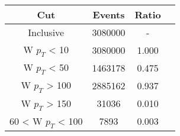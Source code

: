\begin{tabular}{|c||c|c|c|}
\hline
Cut & Events & Ratio\\\hline
Inclusive & 3080000 & - \\
W $p_{T}$ < 10 & 3080000 & 1.000 \\
W $p_{T}$ < 50 & 1463178 & 0.475 \\
W $p_{T}$ > 100 & 2885162 & 0.937 \\
W $p_{T}$ > 150 & 31036 & 0.010 \\
60 < W $p_{T}$ < 100 & 7893 & 0.003 \\
\end{tabular}